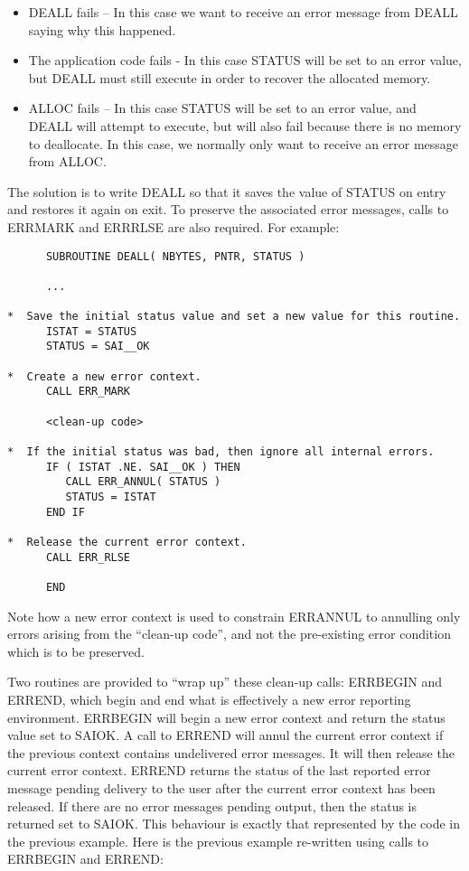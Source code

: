 \documentclass[twoside,11pt]{article}
\renewcommand{\_}{\texttt{\symbol{95}}}
\begin{document}
\begin{itemize}
\item DEALL fails -- In this case we want to receive an error message from
DEALL saying why this happened. 

\item The application code fails - In this case STATUS will be set to an
error value, but DEALL must still execute in order to recover the allocated
memory. 

\item ALLOC fails -- In this case STATUS will be set to an error value, and
DEALL will attempt to execute, but will also fail because there is no memory
to deallocate. 
In this case, we normally only want to receive an error message from ALLOC.
\end {itemize}

The solution is to write DEALL so that it saves the value of STATUS on entry
and restores it again on exit. 
To preserve the associated error messages, calls to ERR\_MARK and ERR\_RLSE
are also required. 
For example:


\begin {small}
\begin{verbatim}
      SUBROUTINE DEALL( NBYTES, PNTR, STATUS )

      ...

*  Save the initial status value and set a new value for this routine.
      ISTAT = STATUS
      STATUS = SAI__OK

*  Create a new error context.
      CALL ERR_MARK

      <clean-up code>

*  If the initial status was bad, then ignore all internal errors.
      IF ( ISTAT .NE. SAI__OK ) THEN
         CALL ERR_ANNUL( STATUS )
         STATUS = ISTAT
      END IF

*  Release the current error context.
      CALL ERR_RLSE

      END
\end{verbatim}
\end {small}

Note how a new error context is used to constrain ERR\_ANNUL to annulling
only errors arising from the ``clean-up code'', and not the pre-existing
error condition which is to be preserved. 

Two routines are provided to ``wrap up'' these clean-up calls: ERR\_BEGIN and
ERR\_END, which begin and end what is effectively a new error reporting
environment.
ERR\_BEGIN will begin a new error context and return the 
status value set to SAI\_\_OK. 
A call to ERR\_END will annul the current error context if the previous
context contains undelivered error messages.
It will then release the current error context.
ERR\_END returns the status of the last reported error message pending
delivery to the user after the current error context has been released.
If there are no error messages pending output, then the status is
returned set to SAI\_\_OK.
This behaviour is exactly that represented by the code in the previous example.
Here is the previous example re-written using calls to ERR\_BEGIN and
ERR\_END:
\end{document}
